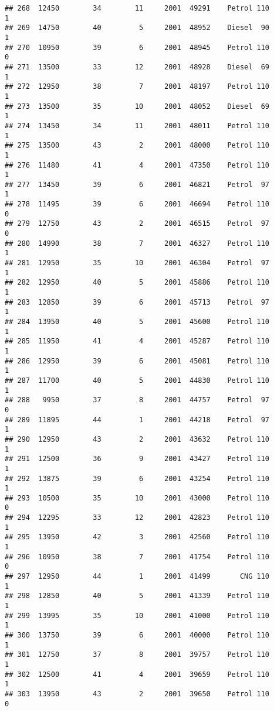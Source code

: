 \documentclass[]{article}
\begin{document}
\begin{verbatim}
## 268  12450        34        11     2001  49291    Petrol 110         1
## 269  14750        40         5     2001  48952    Diesel  90         1
## 270  10950        39         6     2001  48945    Petrol 110         0
## 271  13500        33        12     2001  48928    Diesel  69         1
## 272  12950        38         7     2001  48197    Petrol 110         1
## 273  13500        35        10     2001  48052    Diesel  69         1
## 274  13450        34        11     2001  48011    Petrol 110         1
## 275  13500        43         2     2001  48000    Petrol 110         1
## 276  11480        41         4     2001  47350    Petrol 110         1
## 277  13450        39         6     2001  46821    Petrol  97         1
## 278  11495        39         6     2001  46694    Petrol 110         0
## 279  12750        43         2     2001  46515    Petrol  97         0
## 280  14990        38         7     2001  46327    Petrol 110         1
## 281  12950        35        10     2001  46304    Petrol  97         1
## 282  12950        40         5     2001  45886    Petrol 110         1
## 283  12850        39         6     2001  45713    Petrol  97         1
## 284  13950        40         5     2001  45600    Petrol 110         1
## 285  11950        41         4     2001  45287    Petrol 110         1
## 286  12950        39         6     2001  45081    Petrol 110         1
## 287  11700        40         5     2001  44830    Petrol 110         1
## 288   9950        37         8     2001  44757    Petrol  97         0
## 289  11895        44         1     2001  44218    Petrol  97         1
## 290  12950        43         2     2001  43632    Petrol 110         1
## 291  12500        36         9     2001  43427    Petrol 110         1
## 292  13875        39         6     2001  43254    Petrol 110         1
## 293  10500        35        10     2001  43000    Petrol 110         0
## 294  12295        33        12     2001  42823    Petrol 110         1
## 295  13950        42         3     2001  42560    Petrol 110         1
## 296  10950        38         7     2001  41754    Petrol 110         0
## 297  12950        44         1     2001  41499       CNG 110         1
## 298  12850        40         5     2001  41339    Petrol 110         1
## 299  13995        35        10     2001  41000    Petrol 110         1
## 300  13750        39         6     2001  40000    Petrol 110         1
## 301  12750        37         8     2001  39757    Petrol 110         1
## 302  12500        41         4     2001  39659    Petrol 110         1
## 303  13950        43         2     2001  39650    Petrol 110         0

\end{verbatim}
\end{document}
